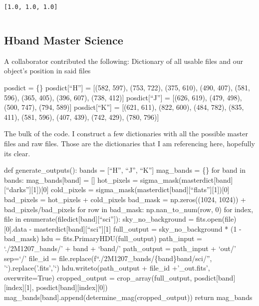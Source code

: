 \documentclass[11pt]{article}
\makeatletter
\newcommand{\boxspacing}{\kern\kvtcb@left@rule\kern\kvtcb@boxsep}
\newcommand{\prompt}[4]{
        {\ttfamily\llap{{\color{#2}[#3]:\hspace{3pt}#4}}\vspace{-\baselineskip}}
    }
\makeatother
\begin{document}
            \begin{tcolorbox}[breakable, size=fbox, boxrule=.5pt, pad at break*=1mm, opacityfill=0]
\prompt{Out}{outcolor}{101}{\boxspacing}
\begin{Verbatim}[commandchars=\\\{\}]
[1.0, 1.0, 1.0]
\end{Verbatim}
\end{tcolorbox}
        
    \begin{tcolorbox}[breakable, size=fbox, boxrule=1pt, pad at break*=1mm,colback=cellbackground, colframe=cellborder]
\prompt{In}{incolor}{ }{\boxspacing}
\begin{Verbatim}[commandchars=\\\{\}]

\end{Verbatim}
\end{tcolorbox}

    \hypertarget{hband-master-science}{%
\subsection{Hband Master Science}\label{hband-master-science}}

    A collaborator contributed the following: Dictionary of all usable files
and our object's position in said files

posdict = \{\} posdict{[}``H''{]} = {[}(582, 597), (753, 722), (375,
610), (490, 407), (581, 596), (365, 405), (396, 607), (738, 412){]}
posdict{[}``J''{]} = {[}(626, 619), (479, 498), (500, 747), (794,
589){]} posdict{[}``K''{]} = {[}(621, 611), (822, 600), (484, 782),
(835, 411), (581, 596), (407, 439), (742, 429), (780, 796){]}

The bulk of the code. I construct a few dictionaries with all the
possible master files and raw files. Those are the dictionaries that I
am referencing here, hopefully its clear.

def generate\_outputs(): bands = {[}``H'', ``J'', ``K''{]} mag\_bands =
\{\} for band in bands: mag\_bands{[}band{]} = {[}{]} hot\_pixels =
sigma\_mask(masterdict{[}band{]}{[}``darks''{]}{[}1{]}){[}0{]}
cold\_pixels =
sigma\_mask(masterdict{[}band{]}{[}``flats''{]}{[}1{]}){[}0{]}
bad\_pixels = hot\_pixels + cold\_pixels bad\_mask = np.zeros((1024,
1024)) + bad\_pixels/bad\_pixels for row in bad\_mask:
np.nan\_to\_num(row, 0) for index, file in
enumerate(filedict{[}band{]}{[}``sci''{]}): sky\_no\_background =
fits.open(file){[}0{]}.data - masterdict{[}band{]}{[}``sci''{]}{[}1{]}
full\_output = sky\_no\_background * (1 - bad\_mask) hdu =
fits.PrimaryHDU(full\_output) path\_input = `./2M1207\_bands/' + band +
`band/' path\_output = path\_input + `out/' sep=`/' file\_id =
file.replace(f``./2M1207\_bands/\{band\}band/sci/'',
'`).replace('.fits','`) hdu.writeto(path\_output + file\_id
+'\_out.fits', overwrite=True) cropped\_output =
crop\_array(full\_output, posdict{[}band{]}{[}index{]}{[}1{]},
posdict{[}band{]}{[}index{]}{[}0{]})
mag\_bands{[}band{]}.append(determine\_mag(cropped\_output)) return
mag\_bands
\end{document}
